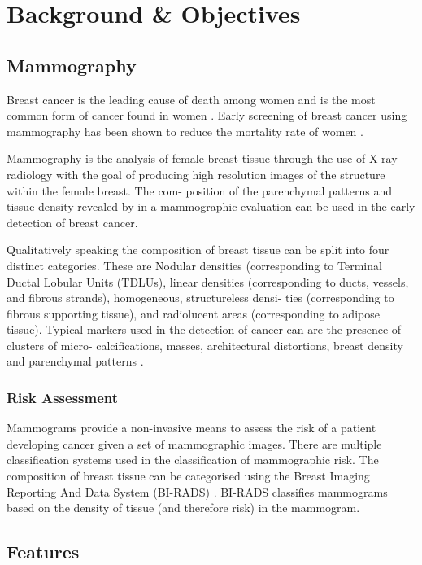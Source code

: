 \chapter{Background \& Objectives}

\section{Mammography}

Breast cancer is the leading cause of death among women and is the most common form of cancer found in women \cite{siegel2014cancer}. Early screening of breast cancer using mammography has been shown to reduce the mortality rate of women \cite{independent2012benefits, smith2014cancer}.

Mammography is the analysis of female breast tissue through the use of X-ray radiology with the goal of producing high resolution images of the structure within the female breast. The com- position of the parenchymal patterns and tissue density revealed by in a mammographic evaluation can be used in the early detection of breast cancer.

Qualitatively speaking the composition of breast tissue can be split into four distinct categories. These are Nodular densities (corresponding to Terminal Ductal Lobular Units (TDLUs), linear densities (corresponding to ducts, vessels, and fibrous strands), homogeneous, structureless densi- ties (corresponding to fibrous supporting tissue), and radiolucent areas (corresponding to adipose tissue). Typical markers used in the detection of cancer can are the presence of clusters of micro- calcifications, masses, architectural distortions, breast density and parenchymal patterns \cite{mccormack2006breast, sampat2005computer}.

\subsection{Risk Assessment}
Mammograms provide a non-invasive means to assess the risk of a patient developing cancer given a set of mammographic images. There are multiple classification systems used in the classification of mammographic risk.
The composition of breast tissue can be categorised using the Breast Imaging Reporting And Data System (BI-RADS) \cite{american1998breast}. BI-RADS classifies mammograms based on the density of tissue (and therefore risk) in the mammogram.

\section{Features}
